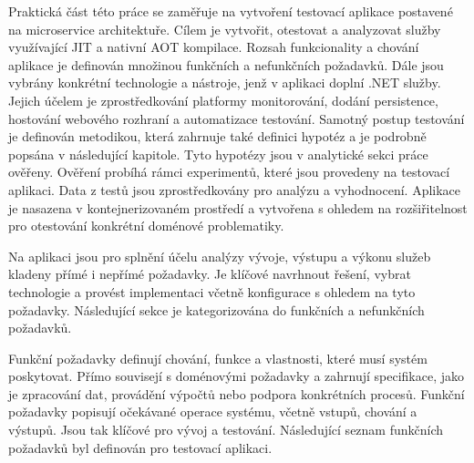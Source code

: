 

Praktická část této práce se zaměřuje na vytvoření testovací aplikace postavené na microservice architektuře. Cílem je vytvořit, otestovat a analyzovat služby využívající JIT a nativní AOT kompilace. Rozsah funkcionality a chování aplikace je definován množinou funkčních a nefunkčních požadavků. Dále jsou vybrány konkrétní technologie a nástroje, jenž v aplikaci doplní .NET služby. Jejich účelem je zprostředkování platformy monitorování, dodání persistence, hostování webového rozhraní a automatizace testování. Samotný postup testování je definován metodikou, která zahrnuje také definici hypotéz a je podrobně popsána v následující kapitole. Tyto hypotézy jsou v analytické sekci práce ověřeny. Ověření probíhá rámci experimentů, které jsou provedeny na testovací aplikaci. Data z testů jsou zprostředkovány pro analýzu a vyhodnocení. Aplikace je nasazena v kontejnerizovaném prostředí a vytvořena s ohledem na rozšiřitelnost pro otestování konkrétní doménové problematiky.


Na aplikaci jsou pro splnění účelu analýzy vývoje, výstupu a výkonu služeb kladeny přímé i nepřímé požadavky. Je klíčové navrhnout řešení, vybrat technologie a provést implementaci včetně konfigurace s ohledem na tyto požadavky. Následující sekce je kategorizována do funkčních a nefunkčních požadavků.


Funkční požadavky definují chování, funkce a vlastnosti, které musí systém poskytovat. Přímo souvisejí s doménovými požadavky a zahrnují specifikace, jako je zpracování dat, provádění výpočtů nebo podpora konkrétních procesů. Funkční požadavky popisují očekávané operace systému, včetně vstupů, chování a výstupů. Jsou tak klíčové pro vývoj a testování. Následující seznam funkčních požadavků byl definován pro testovací aplikaci.

